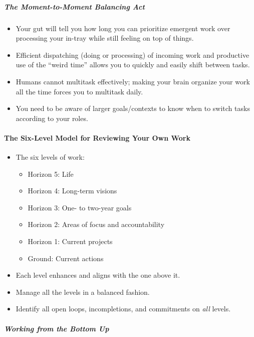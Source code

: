 \documentclass{article}
\begin{document}
\subparagraph{The Moment-to-Moment Balancing Act}

\begin{itemize}
 \item Your gut will tell you how long you can prioritize emergent work over processing your in-tray while still feeling on top of things.
 \item Efficient dispatching (doing or processing) of incoming work and productive use of the ``weird time'' allows you to quickly and easily shift between tasks.
 \item Humans cannot multitask effectively; making your brain organize your work all the time forces you to multitask daily.
 \item You need to be aware of larger goals/contexts to know when to switch tasks according to your roles.
\end{itemize}

\paragraph{The Six-Level Model for Reviewing Your Own Work}

\begin{itemize}
 \item The six levels of work:
 \begin{itemize}
  \item Horizon 5: Life
  \item Horizon 4: Long-term visions
  \item Horizon 3: One- to two-year goals
  \item Horizon 2: Areas of focus and accountability
  \item Horizon 1: Current projects
  \item Ground: Current actions
 \end{itemize}
 \item Each level enhances and aligns with the one above it.
 \item Manage all the levels in a balanced fashion.
 \item Identify all open loops, incompletions, and commitments on \emph{all} levels.
\end{itemize}

\subparagraph{Working from the Bottom Up}
\end{document}
